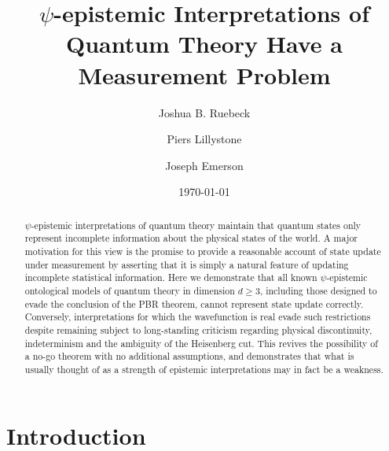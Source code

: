\documentclass[%
 reprint, onecolumn, 12pt,
superscriptaddress,
nofootinbib,
 prx, 
]{quantumarticle}
\begin{document}
\title{$\psi$-epistemic Interpretations of Quantum Theory Have a Measurement Problem}%

\author{Joshua B. Ruebeck}
\author{Piers Lillystone}
%
\author{Joseph Emerson}
\date{\today} 


\begin{abstract}
  $\psi$-epistemic interpretations of quantum theory maintain that
  quantum states only represent incomplete information about the
  physical states of the world.  A major motivation for this view is
  the promise to provide a reasonable account of state update under
  measurement by asserting that it is simply a natural feature of
  updating incomplete statistical information.  Here we demonstrate
  that all known $\psi$-epistemic ontological models of quantum theory
  in dimension $d\geq3$, including those designed to evade the 
  conclusion of the PBR theorem, cannot represent state update
  correctly. Conversely, interpretations for which the wavefunction is
  real evade such restrictions despite remaining subject to
  long-standing criticism regarding physical discontinuity,
  indeterminism and the ambiguity of the Heisenberg cut. This revives
  the possibility of a no-go theorem with no additional assumptions,
  and demonstrates that what is usually thought of as a strength of
  epistemic interpretations may in fact be a weakness.
\end{abstract}

\maketitle

\pagestyle{plain}

 
\newpage

\section{Introduction}
\label{sec:introduction}
\end{document}
